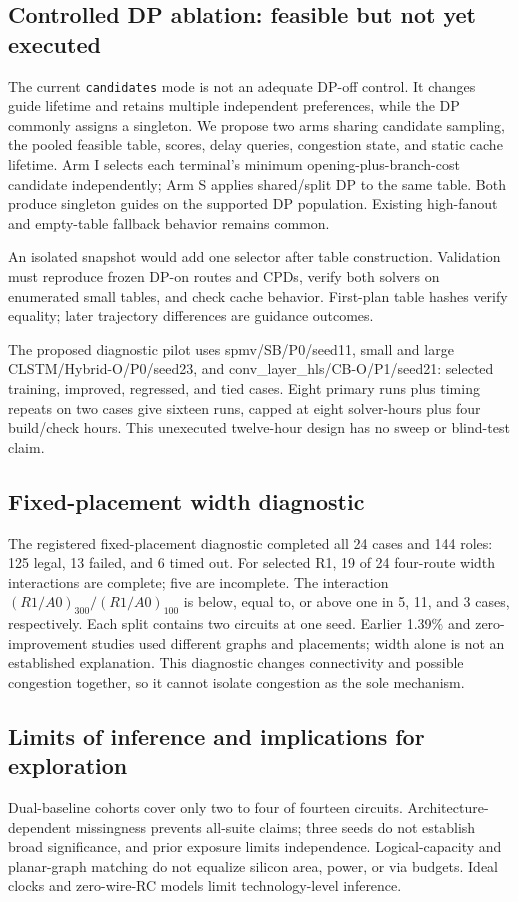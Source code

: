 \documentclass[conference,10pt]{IEEEtran}
\begin{document}
\subsection{Controlled DP ablation: feasible but not yet executed}
The current \texttt{candidates} mode is not an adequate DP-off control. It changes guide lifetime and retains multiple independent preferences, while the DP commonly assigns a singleton. We propose two arms sharing candidate sampling, the pooled feasible table, scores, delay queries, congestion state, and static cache lifetime. Arm I selects each terminal's minimum opening-plus-branch-cost candidate independently; Arm S applies shared/split DP to the same table. Both produce singleton guides on the supported DP population. Existing high-fanout and empty-table fallback behavior remains common.

An isolated snapshot would add one selector after table construction. Validation must reproduce frozen DP-on routes and CPDs, verify both solvers on enumerated small tables, and check cache behavior. First-plan table hashes verify equality; later trajectory differences are guidance outcomes.

The proposed diagnostic pilot uses spmv/SB/P0/seed11, small and large CLSTM/Hybrid-O/P0/seed23, and conv\_layer\_hls/CB-O/P1/seed21: selected training, improved, regressed, and tied cases. Eight primary runs plus timing repeats on two cases give sixteen runs, capped at eight solver-hours plus four build/check hours. This unexecuted twelve-hour design has no sweep or blind-test claim.

\subsection{Fixed-placement width diagnostic}
The registered fixed-placement diagnostic completed all 24 cases and 144 roles: 125 legal, 13 failed, and 6 timed out. For selected R1, 19 of 24 four-route width interactions are complete; five are incomplete. The interaction $(R1/A0)_{300}/(R1/A0)_{100}$ is below, equal to, or above one in 5, 11, and 3 cases, respectively. Each split contains two circuits at one seed. Earlier 1.39\% and zero-improvement studies used different graphs and placements; width alone is not an established explanation. This diagnostic changes connectivity and possible congestion together, so it cannot isolate congestion as the sole mechanism.

\subsection{Limits of inference and implications for exploration}
Dual-baseline cohorts cover only two to four of fourteen circuits. Architecture-dependent missingness prevents all-suite claims; three seeds do not establish broad significance, and prior exposure limits independence. Logical-capacity and planar-graph matching do not equalize silicon area, power, or via budgets. Ideal clocks and zero-wire-RC models limit technology-level inference.
\end{document}
